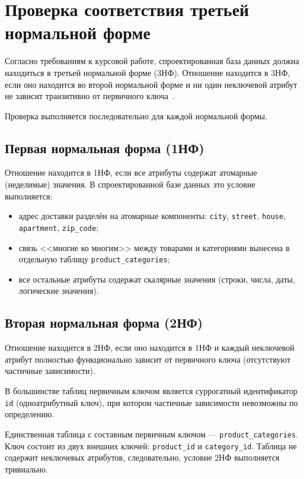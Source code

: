 
\section{Проверка соответствия третьей нормальной форме}

Согласно требованиям к курсовой работе, спроектированная база данных должна находиться в третьей нормальной форме (3НФ). Отношение находится в 3НФ, если оно находится во второй нормальной форме и ни один неключевой атрибут не зависит транзитивно от первичного ключа~\cite{db_models}.

Проверка выполняется последовательно для каждой нормальной формы.

\subsection*{Первая нормальная форма (1НФ)}

Отношение находится в 1НФ, если все атрибуты содержат атомарные (неделимые) значения. В спроектированной базе данных это условие выполняется:

\begin{itemize}
    \item адрес доставки разделён на атомарные компоненты: \texttt{city}, \texttt{street}, \texttt{house}, \texttt{apartment}, \texttt{zip\_code};
    \item связь <<многие ко многим>> между товарами и категориями вынесена в отдельную таблицу \texttt{product\_categories};
    \item все остальные атрибуты содержат скалярные значения (строки, числа, даты, логические значения).
\end{itemize}

\subsection*{Вторая нормальная форма (2НФ)}

Отношение находится в 2НФ, если оно находится в 1НФ и каждый неключевой атрибут полностью функционально зависит от первичного ключа (отсутствуют частичные зависимости).

В большинстве таблиц первичным ключом является суррогатный идентификатор \texttt{id} (одноатрибутный ключ), при котором частичные зависимости невозможны по определению.

Единственная таблица с составным первичным ключом --- \texttt{product\_cate\-gories}. Ключ состоит из двух внешних ключей: \texttt{product\_id} и \texttt{category\_id}. Таблица не содержит неключевых атрибутов, следовательно, условие 2НФ выполняется тривиально.


